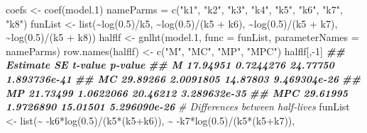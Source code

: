 \documentclass[
  12pt,
]{book}
\newenvironment{Shaded}{\begin{snugshade}}{\end{snugshade}}
\newcommand{\AttributeTok}[1]{\textcolor[rgb]{0.77,0.63,0.00}{#1}}
\newcommand{\CommentTok}[1]{\textcolor[rgb]{0.56,0.35,0.01}{\textit{#1}}}
\newcommand{\DecValTok}[1]{\textcolor[rgb]{0.00,0.00,0.81}{#1}}
\newcommand{\DocumentationTok}[1]{\textcolor[rgb]{0.56,0.35,0.01}{\textbf{\textit{#1}}}}
\newcommand{\FloatTok}[1]{\textcolor[rgb]{0.00,0.00,0.81}{#1}}
\newcommand{\FunctionTok}[1]{\textcolor[rgb]{0.00,0.00,0.00}{#1}}
\newcommand{\NormalTok}[1]{#1}
\newcommand{\OtherTok}[1]{\textcolor[rgb]{0.56,0.35,0.01}{#1}}
\newcommand{\SpecialCharTok}[1]{\textcolor[rgb]{0.00,0.00,0.00}{#1}}
\newcommand{\StringTok}[1]{\textcolor[rgb]{0.31,0.60,0.02}{#1}}
\begin{document}
\begin{Shaded}
\begin{Highlighting}[]
\NormalTok{coefs }\OtherTok{\textless{}{-}} \FunctionTok{coef}\NormalTok{(model}\FloatTok{.1}\NormalTok{)}
\NormalTok{nameParms }\OtherTok{=} \FunctionTok{c}\NormalTok{(}\StringTok{"k1"}\NormalTok{, }\StringTok{"k2"}\NormalTok{, }\StringTok{"k3"}\NormalTok{, }\StringTok{"k4"}\NormalTok{,}
              \StringTok{"k5"}\NormalTok{, }\StringTok{"k6"}\NormalTok{, }\StringTok{"k7"}\NormalTok{, }\StringTok{"k8"}\NormalTok{)}
\NormalTok{funList }\OtherTok{\textless{}{-}} \FunctionTok{list}\NormalTok{(}\SpecialCharTok{\textasciitilde{}}\FunctionTok{log}\NormalTok{(}\FloatTok{0.5}\NormalTok{)}\SpecialCharTok{/}\NormalTok{k5, }
                \SpecialCharTok{\textasciitilde{}}\FunctionTok{log}\NormalTok{(}\FloatTok{0.5}\NormalTok{)}\SpecialCharTok{/}\NormalTok{(k5 }\SpecialCharTok{+}\NormalTok{ k6),}
                \SpecialCharTok{\textasciitilde{}}\FunctionTok{log}\NormalTok{(}\FloatTok{0.5}\NormalTok{)}\SpecialCharTok{/}\NormalTok{(k5 }\SpecialCharTok{+}\NormalTok{ k7),}
                \SpecialCharTok{\textasciitilde{}}\FunctionTok{log}\NormalTok{(}\FloatTok{0.5}\NormalTok{)}\SpecialCharTok{/}\NormalTok{(k5 }\SpecialCharTok{+}\NormalTok{ k8))}
\NormalTok{halflf }\OtherTok{\textless{}{-}} \FunctionTok{gnlht}\NormalTok{(model}\FloatTok{.1}\NormalTok{, }\AttributeTok{func =}\NormalTok{ funList,}
                \AttributeTok{parameterNames =}\NormalTok{ nameParms)}
\FunctionTok{row.names}\NormalTok{(halflf) }\OtherTok{\textless{}{-}} \FunctionTok{c}\NormalTok{(}\StringTok{"M"}\NormalTok{, }\StringTok{"MC"}\NormalTok{, }\StringTok{"MP"}\NormalTok{, }\StringTok{"MPC"}\NormalTok{)}
\NormalTok{halflf[,}\SpecialCharTok{{-}}\DecValTok{1}\NormalTok{]}
\DocumentationTok{\#\#     Estimate        SE  t{-}value      p{-}value}
\DocumentationTok{\#\# M   17.94951 0.7244276 24.77750 1.893736e{-}41}
\DocumentationTok{\#\# MC  29.89266 2.0091805 14.87803 9.469304e{-}26}
\DocumentationTok{\#\# MP  21.73499 1.0622066 20.46212 3.289632e{-}35}
\DocumentationTok{\#\# MPC 29.61995 1.9726890 15.01501 5.296090e{-}26}
\CommentTok{\# Differences between half{-}lives}
\NormalTok{funList }\OtherTok{\textless{}{-}} \FunctionTok{list}\NormalTok{(}\SpecialCharTok{\textasciitilde{}} \SpecialCharTok{{-}}\NormalTok{k6}\SpecialCharTok{*}\FunctionTok{log}\NormalTok{(}\FloatTok{0.5}\NormalTok{)}\SpecialCharTok{/}\NormalTok{(k5}\SpecialCharTok{*}\NormalTok{(k5}\SpecialCharTok{+}\NormalTok{k6)), }
                \SpecialCharTok{\textasciitilde{}} \SpecialCharTok{{-}}\NormalTok{k7}\SpecialCharTok{*}\FunctionTok{log}\NormalTok{(}\FloatTok{0.5}\NormalTok{)}\SpecialCharTok{/}\NormalTok{(k5}\SpecialCharTok{*}\NormalTok{(k5}\SpecialCharTok{+}\NormalTok{k7)),}

\end{Highlighting}
\end{Shaded}
\end{document}
